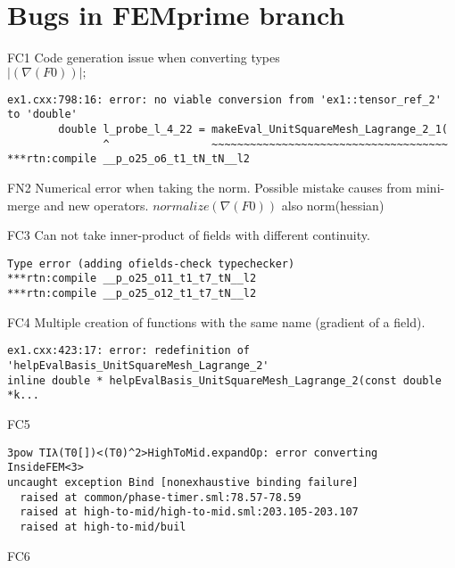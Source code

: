 \section{Bugs in FEMprime branch}

\begin{description}
\item{FC1} Code generation issue when converting types\\
$|(\nabla(F0))|;$

\begin{lstlisting}[mathescape=true]
ex1.cxx:798:16: error: no viable conversion from 'ex1::tensor_ref_2' to 'double'
        double l_probe_l_4_22 = makeEval_UnitSquareMesh_Lagrange_2_1(
               ^                ~~~~~~~~~~~~~~~~~~~~~~~~~~~~~~~~~~~~~
***rtn:compile __p_o25_o6_t1_tN_tN__l2
\end{lstlisting}
\item{FN2}
Numerical error  when taking the norm. Possible mistake causes from mini-merge and new operators.
$normalize(\nabla(F0))$ also   norm(hessian)\\

 
\item{FC3} Can not take inner-product of fields with different continuity.
\begin{lstlisting}[mathescape=true]
Type error (adding ofields-check typechecker)
***rtn:compile __p_o25_o11_t1_t7_tN__l2
***rtn:compile __p_o25_o12_t1_t7_tN__l2
\end{lstlisting}
\item{FC4} Multiple creation of functions with the same name (gradient of a field).
\begin{lstlisting}[mathescape=true]
ex1.cxx:423:17: error: redefinition of 'helpEvalBasis_UnitSquareMesh_Lagrange_2'
inline double * helpEvalBasis_UnitSquareMesh_Lagrange_2(const double *k...
\end{lstlisting}

\item{FC5}
\begin{lstlisting}[mathescape=true]
3pow TIλ(T0[])<(T0)^2>HighToMid.expandOp: error converting InsideFEM<3>
uncaught exception Bind [nonexhaustive binding failure]
  raised at common/phase-timer.sml:78.57-78.59
  raised at high-to-mid/high-to-mid.sml:203.105-203.107
  raised at high-to-mid/buil
  \end{lstlisting}
  
\item{FC6}




\end{description}
